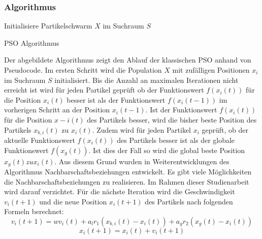 \documentclass[a4paper, 11pt]{article}
\begin{document}
\subsubsection{Algorithmus}
\begin{framed}
	\begin{algorithm}[H]
		Initialisiere Partikelschwarm $X$ im Suchraum $S$\;
		\caption{\acs{PSO} Algorithmus}
		\label{psoalgo}
	\end{algorithm}
\end{framed}
Der abgebildete Algorithmus zeigt den Ablauf der klassischen \acs{PSO} anhand von Pseudocode. Im ersten Schritt wird die Population $X$ mit zufälligen Positionen $x_{i}$ im Suchraum $S$ initialisiert. Bis die Anzahl an maximalen Iterationen nicht erreicht ist wird für jeden Partikel geprüft ob der Funktionswert $f(x_{i}(t))$ für die Position $x_{i}(t)$ besser ist als der Funktionswert $f(x_{i}(t-1))$ im vorherigen Schritt an der Position $x_{i}(t-1)$. Ist der Funktionswert $f(x_{i}(t))$ für die Position $x-{i}(t)$ des Partikels besser, wird die bisher beste Position des Partikels $x_{b,i}(t)$ zu $x_{i}(t)$. Zudem wird für jeden Partikel $x_{i}$ geprüft, ob der aktuelle Funktionswert $f(x_{i}(t))$ des Partikels besser ist als der globale Funktionswert $f(x_{g}(t))$. Ist dies der Fall so wird die global beste Position $x_{g}(t) zu x_{i}(t)$. Aus diesem Grund wurden in Weiterentwicklungen des Algorithmus Nachbarschaftsbeziehungen entwickelt. Es gibt viele Möglichkeiten die Nachbarschaftsbeziehungen zu realisieren. Im Rahmen dieser Studienarbeit wird darauf verzichtet. Für die nächste Iteration wird die Geschwindigkeit $v_{i}(t+1)$ und die neue Position $x_{i}(t+1)$ des Partikels nach folgenden Formeln berechnet:
\begin{equation}
v_{i}(t+1) = wv_{i}(t) + a_{l}r_{1}(x_{b,i}(t) - x_{i}(t)) + a_{g}r_{2}(x_{g}(t) - x_{i}(t))
\end{equation} 
\begin{equation}
x_{i}(t+1) = x_{i}(t) + v_{i}(t+1)
\end{equation}
\end{document}

